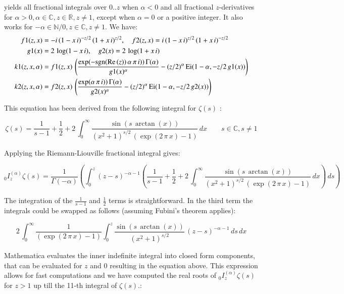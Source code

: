 \documentclass[a4paper,11pt,twoside]{amsart}
\newcommand\Ei{\mathrm{Ei}}
\newcommand{\sgn}{\text{sgn}}
\renewcommand\Re{{\operatorname{Re\,}}}
\begin{document}
yields all fractional integrals over $0..z$ when $\alpha < 0$ and all fractional $z$-derivatives for $\alpha > 0, \alpha \in \mathbb{C}, z \in \mathbb{R}, z \ne 1$, except when $\alpha=0$ or a positive integer. It also works for $-\alpha \in \mathbb{N}/0, z \in \mathbb{C}, z \ne 1$. We have:
\begin{align}
f1(z,x) &= -i\,(1-x\,i)^{-z/2}\,(1+x\,i)^{z/2}, \quad f2(z,x) = i\,(1-x\,i)^{z/2}\,(1+x\,i)^{-z/2}\\
g1(x) &= 2\,\log(1-x\,i), \quad g2(x) = 2\,\log(1+x\,i)\\
k1(z,x,\alpha) &= f1(z,x)\,\left(\frac{\exp(-\sgn(\Re(z))\,\alpha\,\pi\,i))\,\Gamma(\alpha)}{g1(x)^{\alpha}} -(z/2)^{\alpha}\,\Ei(1-\alpha, -z/2\,g1(x)) \right)\\
k2(z,x,\alpha) &= f2(z,x)\,\left(\frac{\exp(\alpha\,\pi\,i))\,\Gamma(\alpha)}{g2(x)^{\alpha}} -(z/2)^{\alpha}\,\Ei(1-\alpha, -z/2\,g2(x)) \right)
\notag
\end{align}

This equation has been derived from the following integral for $\zeta(s)$ \cite{zeti}:

\begin{equation}\label{zetfrac2}
  \zeta(s) = \frac{1}{s-1}+\frac12+2\,\int_0^{\infty} \frac{\sin(s\,\arctan(x))}{(x^2+1)^{s/2}\,(\exp(2\,\pi\,x)-1)} \,dx \qquad s \in \mathbb{C}, s \ne 1
\end{equation}

Applying the Riemann-Liouville fractional integral gives:

\begin{equation}\label{zetfrac3}
  {}_0 I_z^{(\alpha)} \zeta(s) =\frac{1}{\Gamma(-\alpha)} \left( \int_0^z (z-s)^{-\alpha-1} \left( \frac{1}{s-1}+\frac12+2\,\int_0^{\infty} \frac{\sin(s\,\arctan(x))}{(x^2+1)^{s/2}\,(\exp(2\,\pi\,x)-1)} \,dx \right) \, ds \right)
\end{equation}

The integration of the $\frac{1}{s-1}$ and $\frac12$ terms is straightforward. In the third term the integrals could be swapped as follows (assuming Fubini's theorem applies):

\begin{equation}\label{zetfrac4}
 2\,\int_0^{\infty} \frac{1}{(\exp(2\,\pi\,x)-1)} \int_0^z \frac{\sin(s\,\arctan(x))}{(x^2+1)^{s/2}}\,(z-s)^{-\alpha-1} \,ds \, dx
\end{equation}


Mathematica\texttrademark{} evaluates the inner indefinite integral into closed form components, that can be evaluated for $z$ and $0$ resulting in the equation above. This expression allows for fast computations and we have computed the real roots of ${}_0 I_z^{(\alpha)} \zeta(s)$ for $z > 1$ up till the 11-th integral of $\zeta(s)$.:
\end{document}
